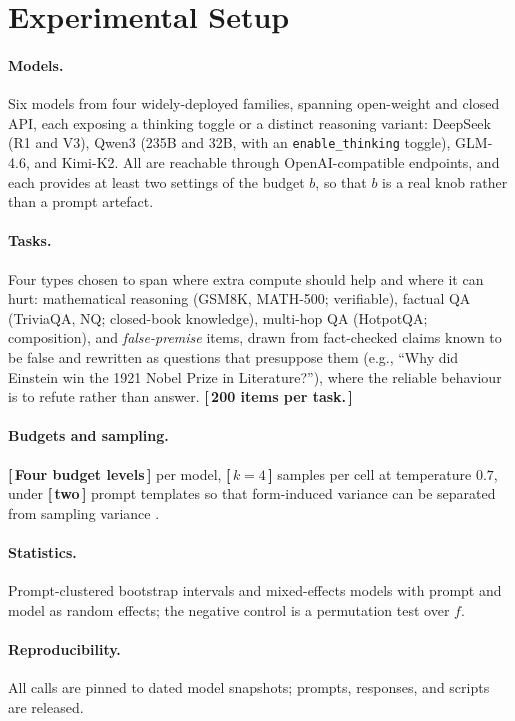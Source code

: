 \documentclass[11pt]{article}
\newcommand{\PH}[1]{\textbf{[\,#1\,]}}
\begin{document}
\section{Experimental Setup}
\paragraph{Models.}
Six models from four widely-deployed families, spanning open-weight and
closed API, each exposing a thinking toggle or a distinct reasoning variant:
DeepSeek (R1 and V3), Qwen3 (235B and 32B, with an \texttt{enable\_thinking}
toggle), GLM-4.6, and Kimi-K2.
All are reachable through OpenAI-compatible endpoints, and each provides at
least two settings of the budget $b$, so that $b$ is a real knob rather than a
prompt artefact.
\paragraph{Tasks.}
Four types chosen to span where extra compute should help and where it can
hurt: mathematical reasoning (GSM8K, MATH-500; verifiable), factual QA
(TriviaQA, NQ; closed-book knowledge), multi-hop QA (HotpotQA; composition),
and \emph{false-premise} items, drawn from fact-checked claims known to be
false \citep{Wadden2020SciFact} and rewritten as questions that presuppose
them (e.g., ``Why did Einstein win the 1921 Nobel Prize in Literature?''),
where the reliable behaviour is to refute rather than answer. \PH{200 items
per task.}
\paragraph{Budgets and sampling.}
\PH{Four budget levels} per model, \PH{$k=4$} samples per cell at temperature
$0.7$, under \PH{two} prompt templates so that form-induced variance can be
separated from sampling variance \citep{Miller2024ErrorBars}.
\paragraph{Statistics.}
Prompt-clustered bootstrap intervals and mixed-effects models with prompt and
model as random effects; the negative control is a permutation test over $f$.
\paragraph{Reproducibility.}
All calls are pinned to dated model snapshots; prompts, responses, and scripts
are released.
\end{document}
